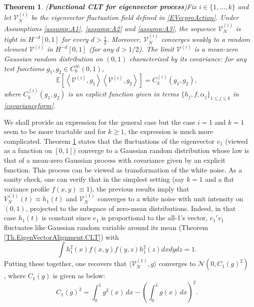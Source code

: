 \documentclass[11pt, reqno]{amsart}
\numberwithin{equation}{section}
\newtheorem{theorem}{Theorem}[section]
\begin{document}
\begin{theorem}({\bf Functional CLT for eigenvector process})\label{EVecProMain} Fix $i \in \{1,\dots,k\}$ and let $\mathcal V_N^{(i)}$ be the eigenvector fluctuation field defined in \eqref{EVecproAction}. Under Assumptions \ref{assump:A1}, \ref{assump:A2} and \ref{assump:A3}, the sequence ${\mathcal V_N^{(i)}}$ is tight in $H^{-d}[0,1]$ for every $d > \frac12$. Moreover, $\mathcal V_N^{(i)}$ converges weakly to a random element $\mathcal V^{(i)}$ in $H^{-d}[0,1]$ (for any $d>1/2$). The limit $\mathcal V^{(i)}$ is a mean-zero Gaussian random distribution on $(0,1)$ characterized by its covariance: for any test functions $g_1, g_2 \in C_0^\infty(0,1)$,
\begin{equation}\label{Eq:covariance}
\mathbb{E}\left[\left\langle \mathcal V^{(i)}, g_1\right\rangle\left\langle \mathcal V^{(i)}, g_2\right\rangle\right]= C_k^{(i)}(g_1, g_2),
\end{equation}
where $C_k^{(i)}(g_1, g_2)$ is an explicit function given in terms $\{h_j, f, \alpha_j\}_{1\le j\le k}$ in \eqref{covarianceform}. 
\end{theorem}
We shall provide an expression for the general case but the case $i=1$ and $k=1$ seem to be more tractable and for $k\ge 1$, the expression is much more complicated.
Theorem \ref{EVecProMain} states that the fluctuations of the eigenvector $v_1$ (viewed as a function on $[0,1]$) converge to a Gaussian random distribution whose law is that of a mean-zero Gaussian process with covariance given by an explicit function. This process can be viewed as transformation of the white noise. As a sanity check, one can verify that in the simplest setting (say $k=1$ and a flat variance profile $f(x,y)\equiv 1$), the previous results imply that $V_N^{(1)}(t) \approx h_1(t)$ and $\mathcal V_N^{(1)}$ converges to a white noise with unit intensity on $(0,1)$, projected to the subspace of zero-mean distributions. Indeed, in that case $h_1(t)$ is constant since $e_1$ is proportional to the all-1’s vector, $e_1'v_1$ fluctuates like Gaussian random variable around its mean (Theorem \ref{Th.EigenVectorAlignment.CLT}) with $$\int h_1^2(x) f(x,y) f(y,z) h_1^2(z)dxdy dz = 1.$$
 Putting these together, one recovers that $\langle \mathcal V_N^{(1)}, g\rangle$ converges to $\mathcal{N}(0, C_1(g)^2)$, where $C_1(g)$ is given as below:
 \[
 C_1(g)^2=\int_0^1 g^2(x)\, dx - \left(\int_0^1 g(x)\,dx\right)^2.
\]
\end{document}
